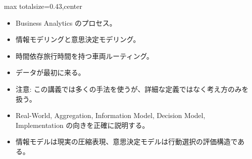 \clearpage
{}
\begin{minipage}[t]{0.405\textwidth}
\begin{adjustbox}{max totalsize={\textwidth}{0.43\textheight},center}
\begin{minipage}{\textwidth}\scriptsize
{}\begin{itemize}
\item Business Analytics のプロセス。
\item 情報モデリングと意思決定モデリング。
\item 時間依存旅行時間を持つ車両ルーティング。
\item データが最初に来る。
\item 注意: この講義では多くの手法を使うが、詳細な定義ではなく考え方のみを扱う。
\end{itemize}\begin{itemize}
\item Real-World, Aggregation, Information Model, Decision Model, Implementation の向きを正確に説明する。
\item 情報モデルは現実の圧縮表現、意思決定モデルは行動選択の評価構造である。
\end{itemize}
\end{minipage}
\end{adjustbox}
\end{minipage}\hfill

